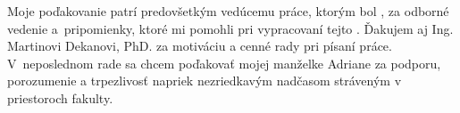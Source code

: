 
Moje poďakovanie patrí predovšetkým vedúcemu práce, ktorým bol \printVeduciZaverecnejPrace, za odborné vedenie a~pripomienky, ktoré mi pomohli pri vypracovaní tejto \typPraceTempII. Ďakujem aj Ing. Martinovi Dekanovi, PhD. za motiváciu a cenné rady pri písaní práce. V~neposlednom rade sa chcem poďakovať mojej manželke Adriane za podporu, porozumenie a trpezlivosť napriek nezriedkavým nadčasom stráveným v priestoroch fakulty.